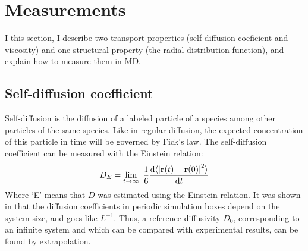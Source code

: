 \section{Measurements}
I this section, I describe two transport properties (self diffusion coeficient and viscosity) and one structural property (the radial distribution function), and explain how to measure them in MD.

\subsection{Self-diffusion coefficient}
Self-diffusion is the diffusion of a labeled particle of a species among other particles of the same species. Like in regular diffusion, the expected concentration of this particle in time will be governed by Fick's law. The self-diffusion coefficient can be measured with the Einstein relation:
\begin{equation}
	D_E = \lim_{t\to\infty} \frac{1}{6} \frac{\dd \langle \left|\rvec(t) - \rvec(0)\right|^2\rangle}{\dd t}
	\label{eq:Einstein_diffusivity}
\end{equation}
Where `E' means that $D$ was estimated using the Einstein relation. It was shown in \cite{Yeh2004} that the diffusion coefficients in periodic simulation boxes depend on the system size, and goes like $L^{-1}$. Thus, a reference diffusivity $D_0$, corresponding to an infinite system and which can be compared with experimental results, can be found by extrapolation.

